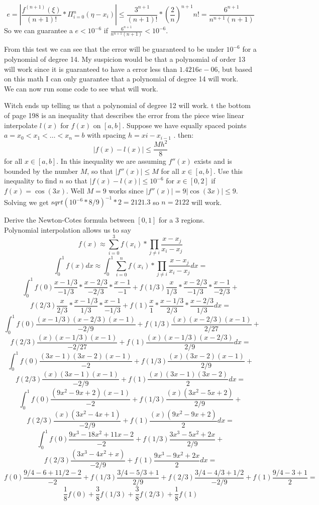 \documentclass[12pt]{article}
\makeatletter
\theoremstyle{homework}
\newenvironment{exercise}[1]
{\def\@currentlabel{#1}\exercisecore}
{\endexercisecore}
\makeatother
\begin{document}
$$e=|\frac{f^{(n+1)}(\xi)}{(n+1)!}*\Pi_{i=0}^{n}(\eta-x_i)|\leq
\frac{3^{n+1}}{(n+1)!}*(\frac{2}{n})^{n+1}n!=
\frac{6^{n+1}}{n^{n+1}(n+1)}
$$
So we can guarantee a $e<10^{-6}$ if $\frac{6^{n+1}}{n^{n+1}(n+1)}<10^{-6}$.

From this test we can see that the error will be guaranteed to be under $10^{-6}$ for a polynomial of degree 14.  My suspicion would be that a polynomial of order 13 will work since it is guaranteed to have a error less than $1.4216e-06$, but based on this math I can only guarantee that a polynomial of degree 14 will work.\\
We can now run some code to see what will work.

Witch ends up telling us that a polynomial of degree 12 will work.
\begin{exercise}

At the bottom of page 198 is an inequality that describes the error from the piece wise linear
interpolate $l(x)$ for $f (x)$ on $[a, b]$. Suppose we have equally spaced points $a =
x_0 < x_1 < \dots < x_n = b$ with spacing $h = xi - x_{i-1}$
.  then:
$$|f (x) - l(x)| \leq
\frac{Mh^2}{
8}$$
for all $x \in [a, b]$. In this inequality we are assuming $f
''(x)$ exists and is bounded by the
number $M$, so that $|f
''(x)| \leq M$ for all $x \in [a, b]$. Use this inequality to find $n$ so that
$|f (x) - l(x)| \leq 10^{-6}$
for $x \in [0, 2]$ if $f (x) = \cos(3x)$.
\end{exercise}
Well $M=9$ works since $|f'' (x)| = 9|\cos(3x)|\leq 9$.  Solving we get $sqrt(10^{-6}*8/9)^{-1}*2=2121.3$ so $n=2122$ will work.

\begin{exercise}

10.1
\end{exercise}
Derive the Newton-Cotes formula between $[0,1]$ for a 3 regions.\\
Polynomial interpolation allows us to say 
$$f(x) \approx \sum_{i=0}^{3} f(x_i)*\prod_{j\neq i}\frac{x-x_j}{x_i-x_j}$$
$$\int_{0}^{1} f(x) dx \approx \int_{0}^{1}\sum_{i=0}^{n} f(x_i)*\prod_{j\neq i}\frac{x-x_j}{x_i-x_j}dx=$$
$$\int_{0}^{1}f(0)\frac{x-1/3}{-1/3}*\frac{x-2/3}{-2/3}*\frac{x-1}{-1}+f(1/3)\frac{x}{1/3}*\frac{x-2/3}{-1/3}*\frac{x-1}{-2/3}+$$
$$f(2/3)\frac{x}{2/3}*\frac{x-1/3}{1/3}*\frac{x-1}{-1/3}+f(1)\frac{x}{1}*\frac{x-1/3}{2/3}*\frac{x-2/3}{1/3}dx=$$
$$\int_{0}^{1}f(0)\frac{(x-1/3)(x-2/3)(x-1)}{-2/9}+f(1/3)\frac{(x)(x-2/3)(x-1)}{2/27}+$$
$$f(2/3)\frac{(x)(x-1/3)(x-1)}{-2/27}+f(1)\frac{(x)(x-1/3)(x-2/3)}{2/9}dx=$$
$$\int_{0}^{1}f(0)\frac{(3x-1)(3x-2)(x-1)}{-2}+f(1/3)\frac{(x)(3x-2)(x-1)}{2/9}+$$
$$f(2/3)\frac{(x)(3x-1)(x-1)}{-2/9}+f(1)\frac{(x)(3x-1)(3x-2)}{2}dx=$$
$$\int_{0}^{1}f(0)\frac{(9x^2-9x+2)(x-1)}{-2}+f(1/3)\frac{(x)(3x^2-5x+2)}{2/9}+$$
$$f(2/3)\frac{(x)(3x^2-4x+1)}{-2/9}+f(1)\frac{(x)(9x^2-9x+2)}{2}dx=$$
$$\int_{0}^{1}f(0)\frac{9x^3-18x^2+11x-2}{-2}+f(1/3)\frac{3x^3-5x^2+2x}{2/9}+$$
$$f(2/3)\frac{(3x^3-4x^2+x)}{-2/9}+f(1)\frac{9x^3-9x^2+2x}{2}dx=$$
$$f(0)\frac{9/4-6+11/2-2}{-2}+f(1/3)\frac{3/4-5/3+1}{2/9}+f(2/3)\frac{3/4-4/3+1/2}{-2/9}+f(1)\frac{9/4-3+1}{2}=$$
$$\frac{1}{8}f(0)+\frac{3}{8}f(1/3)+\frac{3}{8}f(2/3)+\frac{1}{8}f(1)$$
\end{document}
